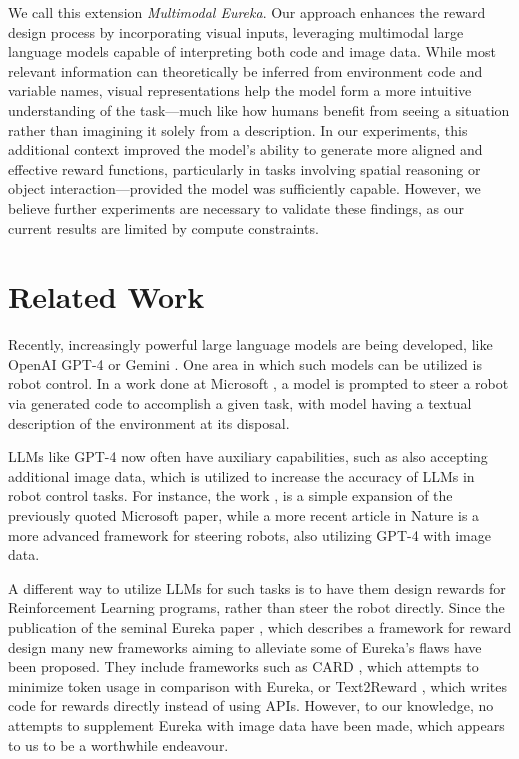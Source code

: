 \documentclass[10pt,twocolumn]{article}
\begin{document}
We call this extension \textit{Multimodal Eureka}. Our approach enhances the reward design process by incorporating visual inputs, leveraging multimodal large language models capable of interpreting both code and image data. While most relevant information can theoretically be inferred from environment code and variable names, visual representations help the model form a more intuitive understanding of the task—much like how humans benefit from seeing a situation rather than imagining it solely from a description. In our experiments, this additional context improved the model’s ability to generate more aligned and effective reward functions, particularly in tasks involving spatial reasoning or object interaction—provided the model was sufficiently capable. However, we believe further experiments are necessary to validate these findings, as our current results are limited by compute constraints.


\section{Related Work}
Recently, increasingly powerful large language models are being developed, like OpenAI GPT-4 \cite{GPT-4} or Gemini \cite{Gemini}. One area in which such models can be utilized is robot control. In a work done at Microsoft \cite{Microsoft}, a model is prompted to steer a robot via generated code to accomplish a given task, with model having a textual description of the environment at its disposal. 

LLMs like GPT-4 now often have auxiliary capabilities, such as also accepting additional image data, which is utilized to increase the accuracy of LLMs in robot control tasks. For instance, the work \cite{TUDelft}, is a simple expansion of the previously quoted Microsoft paper, while a more recent article in Nature \cite{Nature} is a more advanced framework for steering robots, also utilizing GPT-4 with image data.

A different way to utilize LLMs for such tasks is to have them design rewards for Reinforcement Learning programs, rather than steer the robot directly. Since the publication of the seminal Eureka paper \cite{eureka}, which describes a framework for reward design many new frameworks aiming to alleviate some of Eureka's flaws have been proposed. They include frameworks such as CARD \cite{card}, which attempts to minimize token usage in comparison with Eureka, or Text2Reward \cite{Text2Reward}, which writes code for rewards directly instead of using APIs. However, to our knowledge, no attempts to supplement Eureka with image data have been made, which appears to us to be a worthwhile endeavour.
\end{document}
